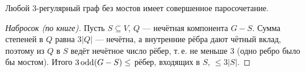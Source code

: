 \begin{cor}[Петерсен]
Любой 3-регулярный граф без мостов имеет совершенное паросочетание.
\end{cor}
\begin{proof}[Набросок (по книге)]
Пусть \(S\subseteq V\), \(Q\) — нечётная компонента \(G-S\). Сумма степеней в \(Q\)
равна \(3|Q|\) — нечётна, а внутренние рёбра дают чётный вклад, поэтому
из \(Q\) в \(S\) ведёт нечётное число рёбер, т.\,е. не меньше \(3\) (одно ребро было бы
мостом). Итого \(3\operatorname{odd}(G-S)\le\) рёбер, входящих в \(S\), \(\le3|S|\).
\end{proof}
